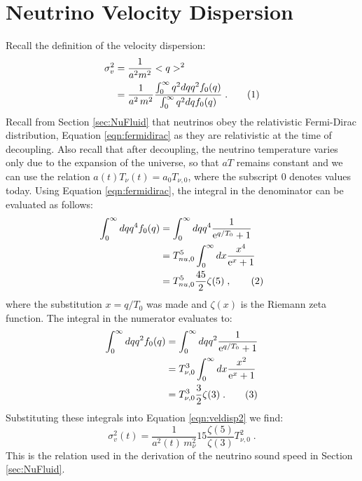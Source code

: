 \documentclass[twocolumn,superscriptaddress,prd]{revtex4}
\newcommand\numberthis{\addtocounter{equation}{1}\tag{\theequation}}
\newcommand{\me}{\mathrm{e}}
\begin{document}
\section{Neutrino Velocity Dispersion}\label{app:AppB}
Recall the definition of the velocity dispersion:
\begin{align*}\label{eqn:veldisp2}
  \sigma_v^2 &= \frac{1}{a^2 m^2 } < q >^2\\
  &= \frac{1}{a^2\, m^2} \frac{ \int_0^\infty q^2 dq q^2 f_0(q) }{
      \int_0^\infty q^2 dq f_0(q) } \;.\numberthis
\end{align*}
Recall from Section \ref{sec:NuFluid} that neutrinos obey the
relativistic Fermi-Dirac distribution, Equation \eqref{eqn:fermidirac} as they are relativistic at the
time of decoupling.  Also recall that after decoupling, the neutrino
temperature varies only due to the expansion of the universe, so that
$aT$ remains constant and we can use the relation $a(t)T_\nu(t) = a_0T_{\nu,0}$,
where the subscript $0$ denotes values today.  
Using Equation \eqref{eqn:fermidirac}, 
the integral in the denominator can be evaluated as follows:
\begin{align*}\label{eqn:veldisp3}
  \int_0^\infty dq q^4 f_0(q) &= \int_0^\infty dq q^4
                                  \frac{1}{\me^{q/T_0} + 1} \\
  &= T_{nu,0}^5 \int_0^\infty dx \frac{ x^4 }{\me^x +1 } \\
  &= T_{nu,0}^5 \frac{45}{2} \zeta (5) \;,\numberthis
\end{align*}
where the substitution $x=q/T_0$ was made and $\zeta(x)$ is the
Riemann zeta function.  The integral in the numerator evaluates to:
\begin{align*}\label{eqn:veldisp4}
  \int_0^{\infty} dq q^2 f_0(q) &= \int_0^\infty dq q^2
                                    \frac{1}{\me^{q/T_0}+1}\\
 &= T_{\nu,0}^3 \int_0^\infty dx \frac{x^2}{\me^x+1}\\
 &= T_{\nu,0}^3 \frac{3}{2} \zeta(3) \;.\numberthis
\end{align*}
Substituting these integrals into Equation \eqref{eqn:veldisp2} we find:
\begin{equation}\label{eqn:veldisp52}
  \sigma_v^2(t) = \frac{1}{a^2(t)\,m^2_\nu} 15 \frac{ \zeta(5)
  }{\zeta(3) }  T_{\nu,0}^2 \;.
\end{equation}
This is the relation used in the derivation of the neutrino sound
speed in Section \ref{sec:NuFluid}.
\end{document}
